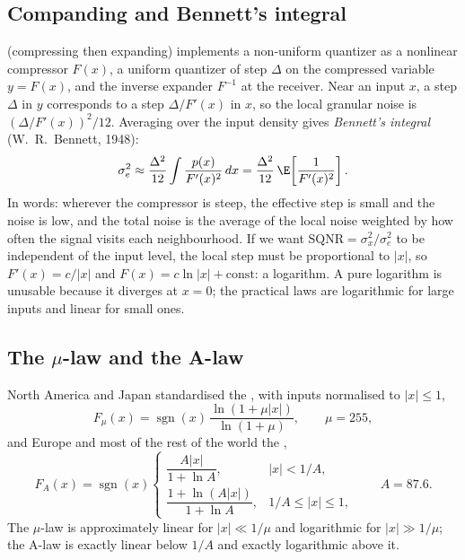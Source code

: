 \subsection{Companding and Bennett's integral}

 (compressing then expanding) implements a non-uniform quantizer as a
nonlinear compressor $F(x)$, a uniform quantizer of step $\Delta$ on the compressed variable
$y=F(x)$, and the inverse expander $F^{-1}$ at the receiver. Near an input $x$, a step $\Delta$
in $y$ corresponds to a step $\Delta/F'(x)$ in $x$, so the local granular noise is
$(\Delta/F'(x))^2/12$. Averaging over the input density gives \emph{Bennett's integral}
(W.~R.~Bennett, 1948):
\begin{equation}
\sigma_e^2\approx\frac{\Delta^2}{12}\int\frac{p(x)}{F'(x)^2}\,dx
=\frac{\Delta^2}{12}\,\E\!\left[\frac{1}{F'(x)^2}\right].
\label{eq:ch05:bennett}
\end{equation}
In words: wherever the compressor is steep, the effective step is small and the noise is low, and
the total noise is the average of the local noise weighted by how often the signal visits each
neighbourhood. If we want $\text{SQNR}=\sigma_x^2/\sigma_e^2$ to be independent of the input level,
the local step must be proportional to $|x|$, so $F'(x)=c/|x|$ and $F(x)=c\ln|x|+\text{const}$: a
logarithm. A pure logarithm is unusable because it diverges at $x=0$; the practical laws are
logarithmic for large inputs and linear for small ones.

\subsection{The \texorpdfstring{$\mu$}{mu}-law and the A-law}

North America and Japan standardised the , with inputs normalised to
$|x|\le1$,
\begin{equation}
F_\mu(x)=\operatorname{sgn}(x)\,\frac{\ln(1+\mu|x|)}{\ln(1+\mu)},\qquad \mu=255,
\label{eq:ch05:mulaw}
\end{equation}
and Europe and most of the rest of the world the ,
\begin{equation}
F_A(x)=\operatorname{sgn}(x)\begin{cases}\dfrac{A|x|}{1+\ln A}, & |x|<1/A,\\[2ex]
\dfrac{1+\ln(A|x|)}{1+\ln A}, & 1/A\le|x|\le1,\end{cases}\qquad A=87.6.
\label{eq:ch05:alaw}
\end{equation}
The $\mu$-law is approximately linear for $|x|\ll1/\mu$ and logarithmic for $|x|\gg1/\mu$;
the A-law is exactly linear below $1/A$ and exactly logarithmic above it.

